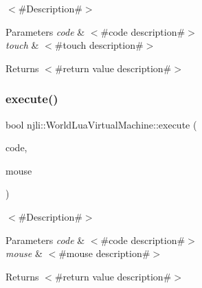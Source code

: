 $<$\#\+Description\#$>$


\begin{DoxyParams}{Parameters}
{\em code} & $<$\#code description\#$>$ \\
\hline
{\em touch} & $<$\#touch description\#$>$ \\
\hline
\end{DoxyParams}
\begin{DoxyReturn}{Returns}
$<$\#return value description\#$>$ 
\end{DoxyReturn}
\mbox{\label{classnjli_1_1_world_lua_virtual_machine_ae307c15aca8546f2df15a38514073b58}} 
\subsubsection{\texorpdfstring{execute()}{execute()}\hspace{0.1cm}{\footnotesize\ttfamily [16/33]}}
{\footnotesize\ttfamily bool njli\+::\+World\+Lua\+Virtual\+Machine\+::execute (\begin{DoxyParamCaption}\item[{const char $\ast$}]{code,  }\item[{const \mbox{\hyperlink{classnjli_1_1_device_mouse}{Device\+Mouse}} \&}]{mouse }\end{DoxyParamCaption})}

$<$\#\+Description\#$>$


\begin{DoxyParams}{Parameters}
{\em code} & $<$\#code description\#$>$ \\
\hline
{\em mouse} & $<$\#mouse description\#$>$ \\
\hline
\end{DoxyParams}
\begin{DoxyReturn}{Returns}
$<$\#return value description\#$>$ 
\end{DoxyReturn}
\mbox{\label{classnjli_1_1_world_lua_virtual_machine_aae3f6a29e70b136722d01b316220bee8}} 
